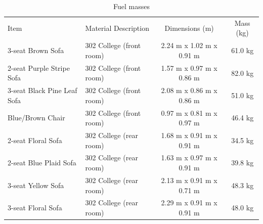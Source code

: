 \documentclass[12pt,oneside]{book}
\begin{document}
		\begin{table}
			\centering
			\caption{Fuel masses}
			\begin{tabular}{llcc}
				\hline\noalign{\smallskip}
				Item                         &  Material Description             &  Dimensions (m)            &  Mass (kg)  \\
				\noalign{\smallskip}\hline\noalign{\smallskip}
				3-seat Brown Sofa            &  302 College (front room)         &  2.24 m x 1.02 m x 0.91 m  &  61.0 kg    \\
				2-seat Purple Stripe Sofa    &  302 College (front room)         &  1.57 m x 0.97 m x 0.86 m  &  82.0 kg    \\
				3-seat Black Pine Leaf Sofa  &  302 College (front room)         &  2.08 m x 0.86 m x 0.86 m  &  51.0 kg    \\
				Blue/Brown Chair             &  302 College (front room)         &  0.97 m x 0.81 m x 0.97 m  &  46.4 kg    \\
				2-seat Floral Sofa           &  302 College (rear room)          &  1.68 m x 0.91 m x 0.91 m  &  34.5 kg    \\
				2-seat Blue Plaid Sofa       &  302 College (rear room)          &  1.63 m x 0.97 m x 0.91 m  &  39.8 kg    \\
				3-seat Yellow Sofa           &  302 College (rear room)          &  2.13 m x 0.91 m x 0.71 m  &  48.3 kg    \\
				3-seat Floral Sofa           &  302 College (rear room)          &  2.29 m x 0.91 m x 0.91 m  &  48.0 kg    \\

\end{tabular}
\end{table}
\end{document}
